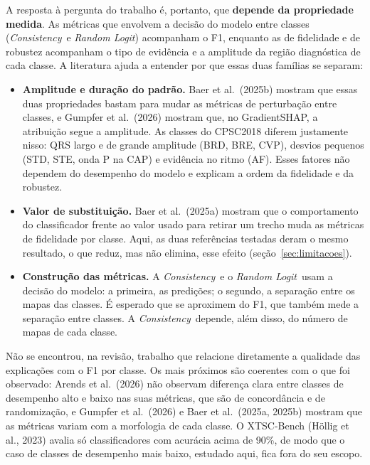 \documentclass[11pt,a4paper]{article}
\newcommand{\CS}{\textit{Consistency}}
\newcommand{\RL}{\textit{Random Logit}}
\begin{document}
A resposta à pergunta do trabalho é, portanto, que \textbf{depende da propriedade medida}. As métricas que envolvem a decisão do modelo entre classes (\CS\ e \RL) acompanham o F1, enquanto as de fidelidade e de robustez acompanham o tipo de evidência e a amplitude da região diagnóstica de cada classe. A literatura ajuda a entender por que essas duas famílias se separam:
\begin{itemize}
\item \textbf{Amplitude e duração do padrão.} Baer et al.\ (2025b) mostram que essas duas propriedades bastam para mudar as métricas de perturbação entre classes, e Gumpfer et al.\ (2026) mostram que, no GradientSHAP, a atribuição segue a amplitude. As classes do CPSC2018 diferem justamente nisso: QRS largo e de grande amplitude (BRD, BRE, CVP), desvios pequenos (STD, STE, onda P na CAP) e evidência no ritmo (AF). Esses fatores não dependem do desempenho do modelo e explicam a ordem da fidelidade e da robustez.
\item \textbf{Valor de substituição.} Baer et al.\ (2025a) mostram que o comportamento do classificador frente ao valor usado para retirar um trecho muda as métricas de fidelidade por classe. Aqui, as duas referências testadas deram o mesmo resultado, o que reduz, mas não elimina, esse efeito (seção~\ref{sec:limitacoes}).
\item \textbf{Construção das métricas.} A \CS\ e o \RL\ usam a decisão do modelo: a primeira, as predições; o segundo, a separação entre os mapas das classes. É esperado que se aproximem do F1, que também mede a separação entre classes. A \CS\ depende, além disso, do número de mapas de cada classe.
\end{itemize}
Não se encontrou, na revisão, trabalho que relacione diretamente a qualidade das explicações com o F1 por classe. Os mais próximos são coerentes com o que foi observado: Arends et al.\ (2026) não observam diferença clara entre classes de desempenho alto e baixo nas suas métricas, que são de concordância e de randomização, e Gumpfer et al.\ (2026) e Baer et al.\ (2025a, 2025b) mostram que as métricas variam com a morfologia de cada classe. O XTSC-Bench (Höllig et al., 2023) avalia só classificadores com acurácia acima de 90\%, de modo que o caso de classes de desempenho mais baixo, estudado aqui, fica fora do seu escopo.
\end{document}
